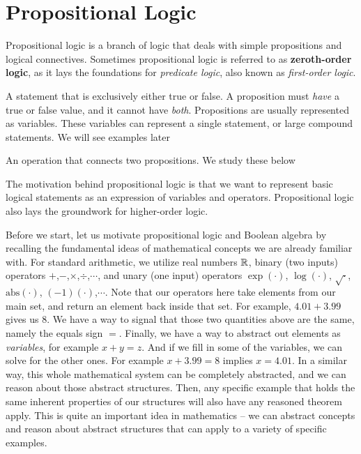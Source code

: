 \documentclass[main.tex]{subfiles}
\begin{document}
\section{Propositional Logic}

Propositional logic is a branch of logic that deals with simple propositions and logical connectives. Sometimes propositional logic is referred to as \textbf{zeroth-order logic}, as it lays the foundations for \textit{predicate logic}, also known as \textit{first-order logic}.

\begin{defn}[Proposition]
	A statement that is exclusively either true or false. A proposition must \textit{have} a true or false value, and it cannot have \textit{both}. Propositions are usually represented as variables. These variables can represent a single statement, or large compound statements. We will see examples later
\end{defn}

\begin{defn}
	An operation that connects two propositions. We study these below
\end{defn}

The motivation behind propositional logic is that we want to represent basic logical statements as an expression of variables and operators.
Propositional logic also lays the groundwork for higher-order logic.

Before we start, let us motivate propositional logic and Boolean algebra by recalling the fundamental ideas of mathematical concepts we are already familiar with.
For standard arithmetic, we utilize real numbers \(\mathbb{R}\), binary (two inputs) operators \(+\),\(-\),\(\times\),\(\div\),\(\cdots\), and unary (one input) operators \(\exp(\cdot)\), \(\log(\cdot)\), \(\sqrt{\cdot}\), \(\text{abs}(\cdot)\), \((-1)(\cdot)\),\(\cdots\).
Note that our operators here take elements from our main set, and return an element back inside that set.
For example, \(4.01 + 3.99\) gives us 8.
We have a way to signal that those two quantities above are the same, namely the equals sign \(=\).
Finally, we have a way to abstract out elements as \textit{variables}, for example \(x+y=z\).
And if we fill in some of the variables, we can solve for the other ones.
For example \(x+3.99=8\) implies \(x=4.01\).
In a similar way, this whole mathematical system can be completely abstracted, and we can reason about those abstract structures.
Then, any specific example that holds the same inherent properties of our structures will also have any reasoned theorem apply.
This is quite an important idea in mathematics -- we can abstract concepts and reason about abstract structures that can apply to a variety of specific examples.
\end{document}
